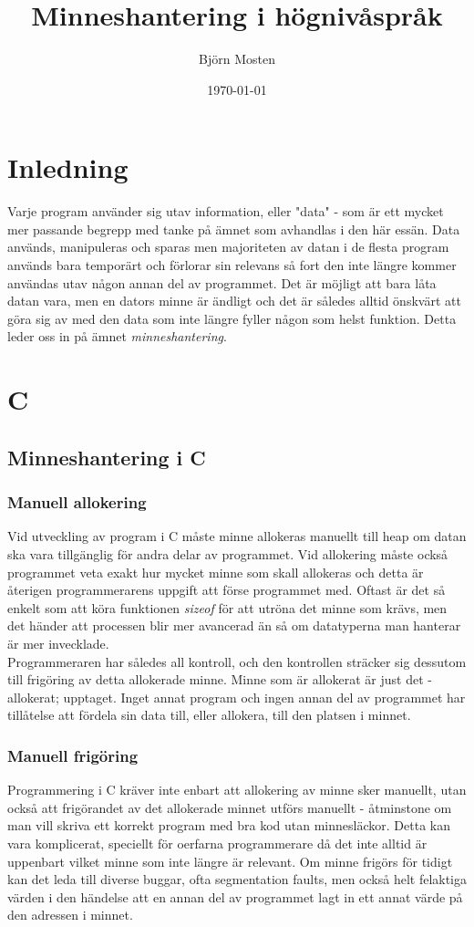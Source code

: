 \documentclass[12pt,a4paper]{article}
\title{Minneshantering i högnivåspråk}
\author{Björn Mosten}
\date{\today}
\begin{document}
\maketitle

\section{Inledning}
Varje program använder sig utav information, eller "data" - som är ett mycket mer passande begrepp med tanke på ämnet som avhandlas i den här essän. Data används, manipuleras och sparas men majoriteten av datan i de flesta program används bara temporärt och förlorar sin relevans så fort den inte längre kommer användas utav någon annan del av programmet. 
Det är möjligt att bara låta datan vara, men en dators minne är ändligt och det är således alltid önskvärt att göra sig av med den data som inte längre fyller någon som helst funktion. Detta leder oss in på ämnet \textit{minneshantering}.

\section{C}
\subsection{Minneshantering i C}
\subsubsection{Manuell allokering}
Vid utveckling av program i C måste minne allokeras manuellt till heap om datan ska vara tillgänglig för andra delar av programmet. Vid allokering måste också 
programmet veta exakt hur mycket minne som skall allokeras och detta är återigen programmerarens uppgift att förse programmet med. Oftast är det så enkelt som att köra funktionen
\textit{sizeof} för att utröna det minne som krävs, men det händer att processen blir
mer avancerad än så om datatyperna man hanterar är mer invecklade.
\\
Programmeraren har således all kontroll, och den kontrollen sträcker sig dessutom till frigöring av detta allokerade minne. Minne 
som är allokerat är just det - allokerat; upptaget. Inget annat program och ingen annan del av programmet har tillåtelse att fördela sin data till,
eller allokera, till den platsen i minnet.
\subsubsection{Manuell frigöring}
Programmering i C kräver inte enbart att allokering av minne sker manuellt, utan också att frigörandet av det allokerade minnet 
utförs manuellt - åtminstone om man vill skriva ett korrekt program med bra kod utan minnesläckor. Detta kan vara 
komplicerat, speciellt för oerfarna programmerare då det inte alltid är uppenbart vilket minne som inte längre är relevant. Om 
minne frigörs för tidigt kan det leda till diverse buggar, ofta segmentation faults,
men också helt felaktiga värden i den händelse att en annan del av programmet lagt in ett annat värde på den adressen i minnet.
\end{document}
